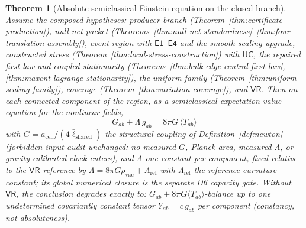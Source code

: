 \documentclass[11pt]{article}
\newtheorem{theorem}{Theorem}[section]
\begin{document}
\begin{theorem}[Absolute semiclassical Einstein equation on the closed branch]
\label{thm:absolute-einstein-base-condition}
Assume the composed hypotheses: producer branch
(Theorem~\ref{thm:certificate-production}), null-net packet
(Theorems~\ref{thm:null-net-standardness}--\ref{thm:four-translation-assembly}),
event region with \(\mathsf{E1}\)--\(\mathsf{E4}\) and the smooth scaling
upgrade, constructed stress (Theorem~\ref{thm:local-stress-construction})
with \(\mathsf{UC}\), the repaired first law and coupled stationarity
(Theorems~\ref{thm:bulk-edge-central-first-law},
\ref{thm:maxent-lagrange-stationarity}), the uniform family
(Theorem~\ref{thm:uniform-scaling-family}), coverage
(Theorem~\ref{thm:variation-coverage}), and \(\mathsf{VR}\). Then on each
connected component of the region, as a semiclassical expectation-value
equation for the nonlinear fields,
\[
\boxed{\;G_{ab}+\Lambda\,g_{ab}=8\pi G\,\langle T_{ab}\rangle\;}
\]
with \(G=a_{\mathrm{cell}}/(4\bar\ell_{\mathrm{shared}})\) the structural
coupling of Definition~\ref{def:newton} (forbidden-input audit unchanged: no
measured \(G\), Planck area, measured \(\Lambda\), or gravity-calibrated
clock enters), and \(\Lambda\) one constant per component, fixed relative to
the \(\mathsf{VR}\) reference by
\(\Lambda=8\pi G\rho_{\mathrm{vac}}+\Lambda_{\mathrm{ref}}\) with
\(\Lambda_{\mathrm{ref}}\) the reference-curvature constant; its global
numerical closure is the separate D6 capacity gate. Without
\(\mathsf{VR}\), the conclusion degrades exactly to: \(G_{ab}+8\pi G\langle
T_{ab}\rangle\)-balance up to one undetermined covariantly constant tensor
\(Y_{ab}=c\,g_{ab}\) per component (constancy, not absoluteness).
\end{theorem}
\end{document}
